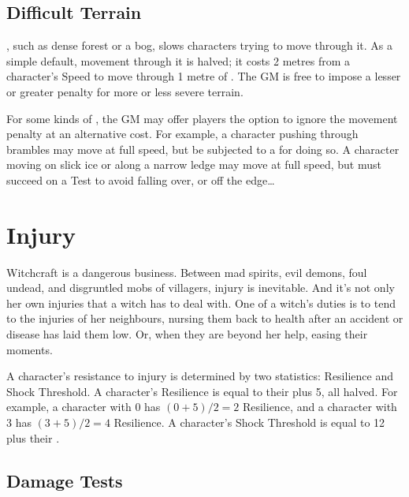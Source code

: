 

\subsection{Difficult Terrain}

, such as dense forest or a bog, slows characters trying to move through it.
As a simple default, movement through it is halved; it costs 2 metres from a character's Speed to move through 1 metre of .
The GM is free to impose a lesser or greater penalty for more or less severe terrain.

For some kinds of , the GM may offer players the option to ignore the movement penalty at an alternative cost.
For example, a character pushing through brambles may move at full speed, but be subjected to a  for doing so.
A character moving on slick ice or along a narrow ledge may move at full speed, but must succeed on a  Test to avoid falling over, or off the edge\dots

\section{Injury}

Witchcraft is a dangerous business.
Between mad spirits, evil demons, foul undead, and disgruntled mobs of villagers, injury is inevitable.
And it's not only her own injuries that a witch has to deal with.
One of a witch's duties is to tend to the injuries of her neighbours, nursing them back to health after an accident or disease has laid them low.
Or, when they are beyond her help, easing their moments.

A character's resistance to injury is determined by two statistics: Resilience and Shock Threshold.
A character's Resilience is equal to their  plus 5, all halved.
For example, a character with $0$  has $(0 + 5)/2 = 2$ Resilience, and a character with $3$  has $(3+5)/2 = 4$ Resilience.
A character's Shock Threshold is equal to 12 plus their .

\subsection{Damage Tests}


